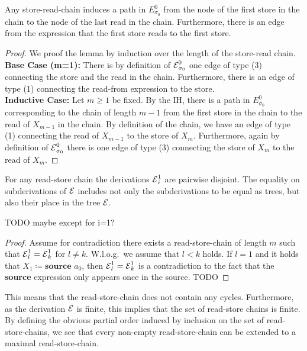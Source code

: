 \begin{lemma}
    \label{lem:chain-to-graph}
    Any store-read-chain induces a path in $E^0_{\sigma_0}$ from the node 
    of the first store in the chain to the node of the last read in the chain.
    Furthermore, there is an edge from the expression that the first store reads
    to the first store.
\end{lemma}
\begin{proof}
    We proof the lemma by induction over the length of the store-read chain.\\
    \textbf{Base Case (m=1):}
    There is by definition of $\operatorname{\mathcal{E}}^0_{\sigma_0}$
    one edge of type (3) connecting the store and the read in the chain.
    Furthermore, there is an edge of type (1) connecting the read-from expression
    to the store.\\
    \textbf{Inductive Case:}
    Let $m \geq 1$ be fixed. By the IH, there is a path in $E^0_{\sigma_0}$
    corresponding to the chain of length $m-1$ from the first store in the chain 
    to the read of $X_{m-1}$ in the chain.
    By definition of the chain, we have an edge of type (1) connecting 
    the read of $X_{m-1}$ to the store of $X_m$.
    Furthermore, again by definition of $\operatorname{\mathcal{E}}^0_{\sigma_0}$
    there is one edge of type (3) connecting the store of $X_m$ to the
    read of $X_m$.
\end{proof}

\begin{lemma}
    For any read-store chain the derivations $\operatorname{\mathcal{E}}^1_i$ are pairwise 
    disjoint.
    The equality on subderivations of $\operatorname{\mathcal{E}}$ includes not only the subderivations
    to be equal as trees, but also their place in the tree $\operatorname{\mathcal{E}}$.

    TODO maybe except for i=1?
\end{lemma}
\begin{proof}
    Assume for contradiction there exists a read-store-chain of length $m$
    such that $\operatorname{\mathcal{E}}^1_l = \operatorname{\mathcal{E}}^1_k$ for $l \neq k$.
    W.l.o.g.\ we assume that $l < k$ holds.
    If $l=1$ and it holds that $X_1 \coloneqq \textbf{source }a_0$, 
    then $\operatorname{\mathcal{E}}^1_l = \operatorname{\mathcal{E}}^1_k$ is a contradiction to the fact that the 
    \textbf{source} expression only appears once in the source.
    TODO
\end{proof}
\begin{remark}
    This means that the read-store-chain does not contain any cycles.
    Furthermore, as the derivation $\operatorname{\mathcal{E}}$ is finite, this implies that the set of 
    read-store chains is finite.
    By defining the obvious partial order induced by inclusion
    on the set of read-store-chains, we see that 
    every non-empty read-store-chain can be extended to a maximal 
    read-store-chain.
\end{remark}

